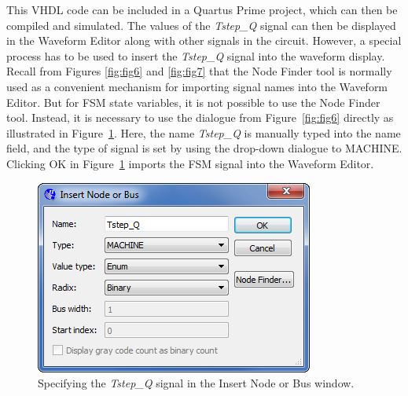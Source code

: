 \documentclass[11pt, twoside, pdftex]{article}
\begin{document}
This VHDL code can be included in a Quartus Prime project, 
which can then be compiled and simulated. The values of the {\it Tstep\_Q} signal can then 
be displayed in the Waveform Editor along with other signals in the circuit. However, a special 
process has to be used to insert the {\it Tstep\_Q} signal into the waveform display. Recall 
from Figures \ref{fig:fig6} and \ref{fig:fig7} that the {\sf Node Finder} tool is normally used 
as a convenient mechanism for importing signal names into the Waveform Editor. But for FSM 
state variables, it is not possible to use the {\sf Node Finder} tool. Instead, it is necessary 
to use the dialogue from Figure~\ref{fig:fig6} directly as illustrated in Figure~\ref{fig:fig29}.
Here, the name {\it Tstep\_Q} is manually typed into the name field, and
the type of signal is set by using the drop-down dialogue to {\sf MACHINE}. Clicking {\sf OK} 
in Figure~\ref{fig:fig29} imports the FSM signal into the Waveform Editor.
\begin{figure}[H]
   \begin{center}
      \includegraphics[scale=0.65]{figures/appendix/figure29.png}
   \caption{Specifying the {\it Tstep\_Q} signal in the {\sf Insert Node or Bus} window.} 
	 \label{fig:fig29}
	 \end{center}
\end{figure} 	
\end{document}
